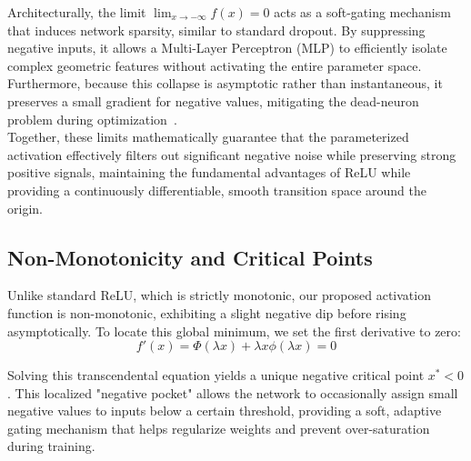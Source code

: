 \documentclass[11pt]{article}
\begin{document}
\noindent Architecturally, the limit $\lim_{x \to -\infty} f(x) = 0$ acts as a soft-gating mechanism that induces network sparsity, similar to standard dropout. By suppressing negative inputs, it allows a Multi-Layer Perceptron (MLP) to efficiently isolate complex geometric features without activating the entire parameter space. Furthermore, because this collapse is asymptotic rather than instantaneous, it preserves a small gradient for negative values, mitigating the dead-neuron problem during optimization~\cite{pmlr-v15-glorot11a, hendrycks2023gaussianerrorlinearunits}.\\

\noindent Together, these limits mathematically guarantee that the parameterized activation effectively filters out significant negative noise while preserving strong positive signals, maintaining the fundamental advantages of ReLU while providing a continuously differentiable, smooth transition space around the origin.

\subsection{Non-Monotonicity and Critical Points}
\noindent Unlike standard ReLU, which is strictly monotonic, our proposed activation function is non-monotonic, exhibiting a slight negative dip before rising asymptotically. To locate this global minimum, we set the first derivative to zero:
\begin{equation*}
f'(x) = \Phi(\lambda x) + \lambda x \phi(\lambda x) = 0
\end{equation*}

\noindent Solving this transcendental equation yields a unique negative critical point $x^* < 0$. This localized "negative pocket" allows the network to occasionally assign small negative values to inputs below a certain threshold, providing a soft, adaptive gating mechanism that helps regularize weights and prevent over-saturation during training.

\end{document}
